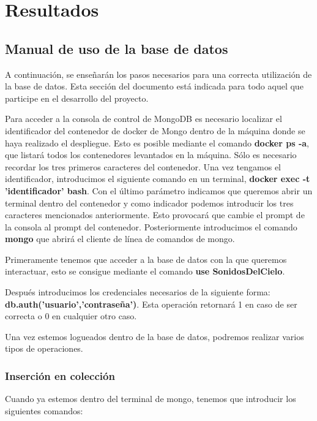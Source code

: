 \chapter{Resultados}

\section{Manual de uso de la base de datos}

A continuación, se enseñarán los pasos necesarios para una correcta utilización de la base de datos. Esta sección del documento está indicada para todo aquel que participe en el desarrollo del proyecto.

Para acceder a la consola de control de MongoDB es necesario localizar el identificador del contenedor de docker de Mongo dentro de la máquina donde se haya realizado el despliegue. Esto es posible mediante el comando \textbf{docker ps -a}, que listará todos los contenedores levantados en la máquina. Sólo es necesario recordar los tres primeros caracteres del contenedor. Una vez tengamos el identificador, introducimos el siguiente comando en un terminal, \textbf{docker exec -t 'identificador' bash}. Con el último parámetro indicamos que queremos abrir un terminal dentro del contenedor y como indicador podemos introducir los tres caracteres mencionados anteriormente. Esto provocará que cambie el prompt de la consola al prompt del contenedor. Posteriormente introducimos el comando \textbf{mongo} que abrirá el cliente de línea de comandos de mongo. 

Primeramente tenemos que acceder a la base de datos con la que queremos interactuar, esto se consigue mediante el comando \textbf{use SonidosDelCielo}.

Después introducimos los credenciales necesarios de la siguiente forma:
\newline\textbf{db.auth('usuario','contraseña')}. Esta operación retornará 1 en caso de ser correcta o 0 en cualquier otro caso.

Una vez estemos logueados dentro de la base de datos, podremos realizar varios tipos de operaciones.


\subsection{Inserción en colección}

Cuando ya estemos dentro del terminal de mongo, tenemos que introducir los siguientes comandos:

